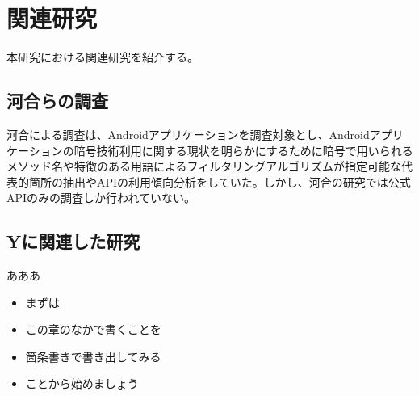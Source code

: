 \newpage
\section{関連研究} %
本研究における関連研究を紹介する。
\subsection{河合らの調査}
河合による調査は、Androidアプリケーションを調査対象とし、Androidアプリケーションの暗号技術利用に関する現状を明らかにするために暗号で用いられるメソッド名や特徴のある用語によるフィルタリングアルゴリズムが指定可能な代表的箇所の抽出やAPIの利用傾向分析をしていた。しかし、河合の研究では公式APIのみの調査しか行われていない。


\subsection{Yに関連した研究}
あああ
\begin{itemize}
\item まずは
\item この章のなかで書くことを
\item 箇条書きで書き出してみる
\item ことから始めましょう
\end{itemize}